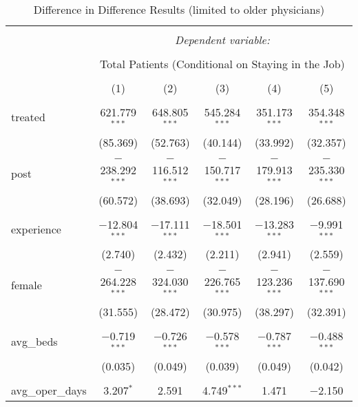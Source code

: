 
\begin{table}[!htbp] \centering 
  \caption{Difference in Difference Results (limited to older physicians)} 
  \label{} 
  \begin{adjustbox}{width=\textwidth}
\begin{tabular}{@{\extracolsep{5pt}}lccccc} 
\\[-1.8ex]\hline 
\hline \\[-1.8ex] 
 & \multicolumn{5}{c}{\textit{Dependent variable:}} \\ 
\cline{2-6} 
\\[-1.8ex] & \multicolumn{5}{c}{Total Patients (Conditional on Staying in the Job)} \\ 
\\[-1.8ex] & (1) & (2) & (3) & (4) & (5)\\ 
\hline \\[-1.8ex] 
 treated & 621.779$^{***}$ & 648.805$^{***}$ & 545.284$^{***}$ & 351.173$^{***}$ & 354.348$^{***}$ \\ 
  & (85.369) & (52.763) & (40.144) & (33.992) & (32.357) \\ 
  & & & & & \\ 
 post & $-$238.292$^{***}$ & $-$116.512$^{***}$ & $-$150.717$^{***}$ & $-$179.913$^{***}$ & $-$235.330$^{***}$ \\ 
  & (60.572) & (38.693) & (32.049) & (28.196) & (26.688) \\ 
  & & & & & \\ 
 experience & $-$12.804$^{***}$ & $-$17.111$^{***}$ & $-$18.501$^{***}$ & $-$13.283$^{***}$ & $-$9.991$^{***}$ \\ 
  & (2.740) & (2.432) & (2.211) & (2.941) & (2.559) \\ 
  & & & & & \\ 
 female & $-$264.228$^{***}$ & $-$324.030$^{***}$ & $-$226.765$^{***}$ & $-$123.236$^{***}$ & $-$137.690$^{***}$ \\ 
  & (31.555) & (28.472) & (30.975) & (38.297) & (32.391) \\ 
  & & & & & \\ 
 avg\_beds & $-$0.719$^{***}$ & $-$0.726$^{***}$ & $-$0.578$^{***}$ & $-$0.787$^{***}$ & $-$0.488$^{***}$ \\ 
  & (0.035) & (0.049) & (0.039) & (0.049) & (0.042) \\ 
  & & & & & \\ 
 avg\_oper\_days & 3.207$^{*}$ & 2.591 & 4.749$^{***}$ & 1.471 & $-$2.150 \\ 

\end{tabular}
\end{adjustbox}
\end{table}
